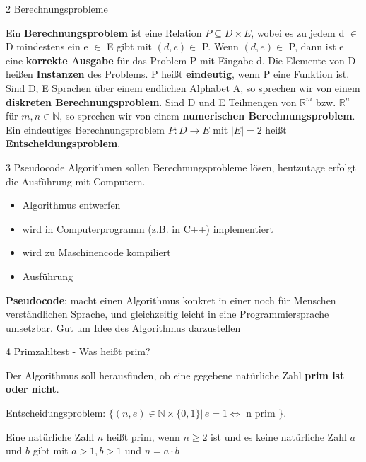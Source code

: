 \documentclass{beamer}
\newcommand{\N}{\mathbb{N}}%
\newcommand{\R}{\mathbb{R}}%
\newtheorem{thm}{Satz}
\begin{document}
\begin{frame}{2 Berechnungsprobleme}

\begin{definition}
     Ein \textbf{Berechnungsproblem} ist eine Relation $P \subseteq D \times E$, wobei es zu jedem d $\in$ D mindestens ein e $\in$ E gibt mit $(d,e) \in $ P. Wenn $(d,e) \in$ P, dann ist e eine \textbf{korrekte Ausgabe} für das Problem P mit Eingabe d. Die Elemente von D heißen \textbf{Instanzen} des Problems. P heißt \textbf{eindeutig}, wenn P eine Funktion ist. Sind D, E Sprachen über einem endlichen Alphabet A, so sprechen wir von einem \textbf{diskreten Berechnungsproblem}. Sind D und E Teilmengen von  $\R^m$ bzw. $\R^n$ für $m, n \in \N $, so sprechen wir von einem \textbf{numerischen Berechnungsproblem}. Ein eindeutiges Berechnungsproblem $P \colon D \to E$
     mit $\left| E \right| = 2$ heißt \textbf{Entscheidungsproblem}. 
\end{definition}

\end{frame}

\begin{frame}{3 Pseudocode}
    Algorithmen sollen Berechnungsprobleme lösen, heutzutage erfolgt die Ausführung mit Computern.
    
    \begin{itemize}
        \item Algorithmus entwerfen
        \item wird in Computerprogramm (z.B. in C++) implementiert
        \item wird zu Maschinencode kompiliert
        \item Ausführung
    \end{itemize}


 \textbf{Pseudocode}: macht einen Algorithmus konkret in einer noch für Menschen verständlichen Sprache, und gleichzeitig leicht in eine Programmiersprache umsetzbar. Gut um Idee des Algorithmus darzustellen   
\end{frame}

\begin{frame}{4 Primzahltest - Was heißt prim?}

 Der Algorithmus soll herausfinden, ob eine gegebene natürliche Zahl \textbf{prim ist oder nicht}. 

 \vspace{0.5em}

   Entscheidungsproblem: \(
   \{(n,e) \in \N \times \{ 0, 1\} | \, e= 1 \iff
   \) n prim $\}$.
   
   \begin{definition}
       Eine natürliche Zahl $n$ heißt prim, wenn \(
       n \geq 2
       \) ist und es keine natürliche Zahl $a$ und $b$ gibt mit \( a > 1, b > 1\) und $n= a \cdot b$
   \end{definition}

  
   
\end{frame}
\end{document}
